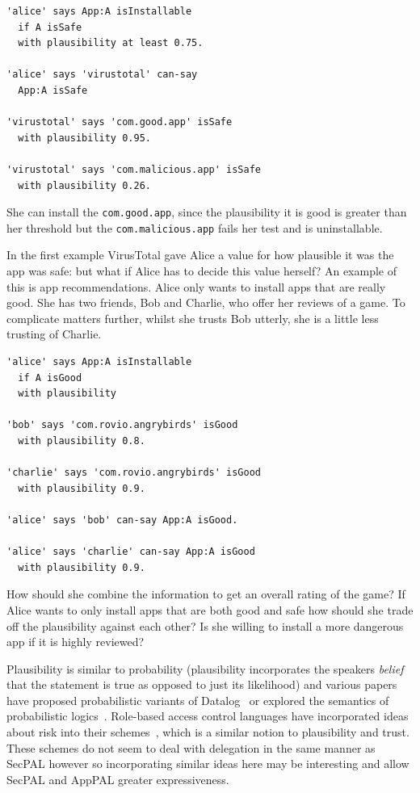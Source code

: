 \documentclass[thesis.tex]{subfiles}
\begin{document}
\begin{lstlisting}
'alice' says App:A isInstallable
  if A isSafe
  with plausibility at least 0.75.

'alice' says 'virustotal' can-say
  App:A isSafe

'virustotal' says 'com.good.app' isSafe
  with plausibility 0.95.

'virustotal' says 'com.malicious.app' isSafe
  with plausibility 0.26.
\end{lstlisting}

She can install the \texttt{com.good.app}, since the plausibility it is good is
greater than her threshold but the \texttt{com.malicious.app} fails her test and
is uninstallable. 

In the first example VirusTotal gave Alice a value for how plausible it was the
app was safe: but what if Alice has to decide this value herself? An example of
this is app recommendations. Alice only wants to install apps that are really
good. She has two friends, Bob and Charlie, who offer her reviews of a game. To
complicate matters further, whilst she trusts Bob utterly, she is a little less
trusting of Charlie.

\begin{lstlisting}
'alice' says App:A isInstallable
  if A isGood
  with plausibility

'bob' says 'com.rovio.angrybirds' isGood
  with plausibility 0.8.

'charlie' says 'com.rovio.angrybirds' isGood
  with plausibility 0.9.

'alice' says 'bob' can-say App:A isGood.

'alice' says 'charlie' can-say App:A isGood
  with plausibility 0.9.
\end{lstlisting}

How should she combine the information to get an overall rating of the game? If
Alice wants to only install apps that are both good and safe how should she
trade off the plausibility against each other? Is she willing to install a more
dangerous app if it is highly reviewed?

Plausibility is similar to probability (plausibility incorporates the speakers
\emph{belief} that the statement is true as opposed to just its likelihood) and
various papers have proposed probabilistic variants of
Datalog~\cite{fuhr_probabilistic_1995} or explored the semantics of
probabilistic logics~\cite{halpern_analysis_1990}. Role-based access control
languages have incorporated ideas about risk into their
schemes~\cite{josang_analysing_2004,dimmock_using_2004,salim_approach_2011},
which is a similar notion to plausibility and trust. These schemes do not seem
to deal with delegation in the same manner as SecPAL however so incorporating
similar ideas here may be interesting and allow SecPAL and AppPAL greater
expressiveness.
\end{document}
